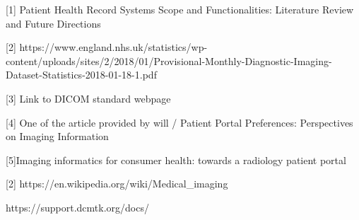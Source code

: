[1] Patient Health Record Systems Scope and Functionalities: Literature Review and Future Directions 

[2] https://www.england.nhs.uk/statistics/wp-content/uploads/sites/2/2018/01/Provisional-Monthly-Diagnostic-Imaging-Dataset-Statistics-2018-01-18-1.pdf


[3] Link to DICOM standard webpage

[4] One of the article provided by will / Patient Portal Preferences: Perspectives on Imaging Information

[5]Imaging informatics for consumer health: towards a radiology patient portal

[2] https://en.wikipedia.org/wiki/Medical_imaging




https://support.dcmtk.org/docs/


